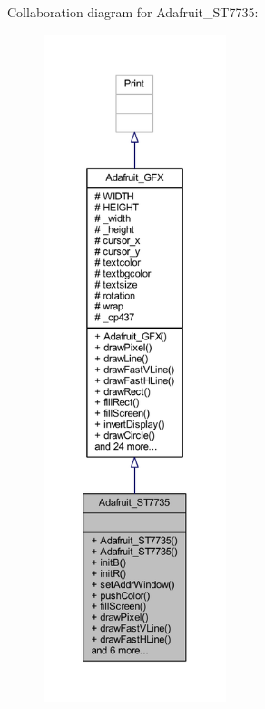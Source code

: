 Collaboration diagram for Adafruit\+\_\+\+S\+T7735\+:
\nopagebreak
\begin{figure}[H]
\begin{center}
\leavevmode
\includegraphics[height=550pt]{d0/d46/class_adafruit___s_t7735__coll__graph}
\end{center}
\end{figure}

